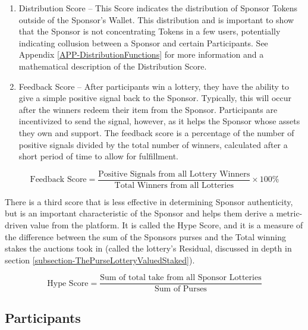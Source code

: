 \documentclass[runningheads]{llncs}
\begin{document}
\begin{enumerate}
\item Distribution Score – This Score indicates the distribution of Sponsor Tokens outside of the Sponsor’s Wallet.  This distribution and is important to show that the Sponsor is not concentrating Tokens in a few users, potentially indicating collusion between a Sponsor and certain Participants.  See Appendix \ref{APP-DistributionFunctions} for more information and a mathematical description of the Distribution Score.
\item Feedback Score – After participants win a lottery, they have the ability to give a simple positive signal back to the Sponsor.  Typically, this will occur after the winners redeem their item from the Sponsor.  Participants are incentivized to send the signal, however, as it helps the Sponsor whose assets they own and support.  The feedback score is a percentage of the number of positive signals divided by the total number of winners, calculated after a short period of time to allow for fulfillment.  
\end{enumerate}

\begin{equation}
\textrm{Feedback Score} = \frac{\textrm{Positive Signals from all Lottery Winners}}{\textrm{Total Winners from all Lotteries} } \times 100 \%
\end{equation}

There is a third score that is less effective in determining Sponsor authenticity, but is an important characteristic of the Sponsor and helps them derive a metric-driven value from the platform.  It is called the Hype Score, and it is a measure of the difference between the sum of the Sponsors purses and the Total winning stakes the auctions took in (called the lottery’s Residual, discussed in depth in section \ref{subsection-ThePurseLotteryValuedStaked}).

\begin{equation}
\textrm{Hype Score} = \frac{\textrm{Sum of total take from all Sponsor Lotteries}}{\textrm{Sum of Purses}}
\end{equation}

\subsection{Participants}\label{subsection-Participants}
\end{document}
